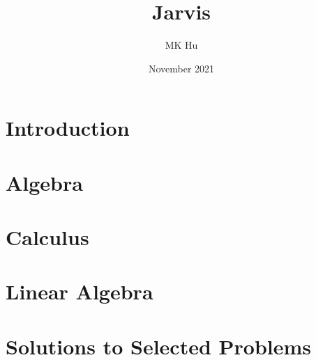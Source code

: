 \documentclass{article}
\title{Jarvis}
\author{MK Hu}
\date{November 2021}
\begin{document}
\maketitle

\section{Introduction}


\section{Algebra}


\section{Calculus}


\section{Linear Algebra}


\section{Solutions to Selected Problems}

\end{document}
